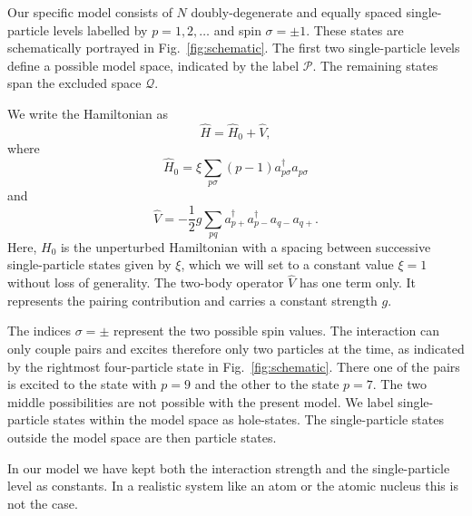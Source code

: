 \documentclass[prc]{revtex4}
\begin{document}
Our specific model consists of $N$ doubly-degenerate and equally
spaced single-particle levels labelled by $p=1,2,\dots$ and spin
$\sigma=\pm 1$.  These states are schematically portrayed in
Fig.~\ref{fig:schematic}.  The first two single-particle levels define
a possible model space, indicated by the label $\mathcal{P}$.  The
remaining states span the excluded space $\mathcal{Q}$.

We write the Hamiltonian as
\[ \hat{H} = \hat{H}_0 + \hat{V} , \]
where
\[
    \hat{H}_0=\xi\sum_{p\sigma}(p-1)a_{p\sigma}^{\dagger}a_{p\sigma}
\]
and
\[
    \hat{V}=-\frac{1}{2}g\sum_{pq}a^{\dagger}_{p+}
    a^{\dagger}_{p-}a_{q-}a_{q+}.
\]
Here, $H_0$ is the unperturbed Hamiltonian with a spacing between
successive single-particle states given by $\xi$, which we will set to
a constant value $\xi=1$ without loss of generality. The two-body
operator $\hat{V}$ has one term only. It represents the pairing
contribution and carries a constant strength $g$.

The indices
$\sigma=\pm$ represent the two possible spin values. The interaction
can only couple pairs and excites therefore only two particles at the
time, as indicated by the rightmost four-particle state in
Fig.~\ref{fig:schematic}. There one of the pairs is excited to the
state with $p=9$ and the other to the state $p=7$. The two middle
possibilities are not possible with the present model.  We label
single-particle states within the model space as hole-states. The
single-particle states outside the model space are then particle
states.

In our model we have kept both the interaction strength and the
single-particle level as constants.  In a realistic system like an
atom or the atomic nucleus this is not the case.
\end{document}
